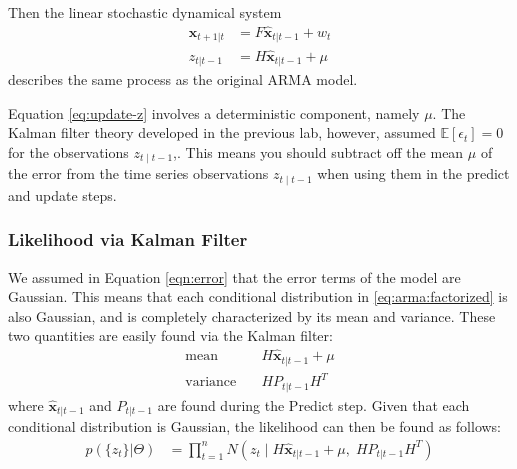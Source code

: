 Then the linear stochastic
dynamical system
\begin{align}
    \hat{\textbf{x}}_{t+1|t} &= F\hat{\textbf{x}}_{t|t-1} + w_t\\
    z_{t|t-1} &= H\hat{\textbf{x}}_{t|t-1} + \mu
    \label{eq:update-z}
\end{align}
describes the same process as the original $\text{ARMA}$ model.

\begin{info}
Equation \ref{eq:update-z} involves a deterministic component, namely $\mu$.
The Kalman filter theory developed in the previous lab, however, assumed $\mathbb{E}[\epsilon_t]=0$ for the observations $z_{t\mid t-1}$,.
This means you should subtract off the mean
$\mu$ of the error from the time series observations $z_{t\mid t-1}$ when using them in the predict and update
steps.
\end{info}

\subsubsection*{Likelihood via Kalman Filter}

We assumed in Equation \ref{eqn:error} that the error terms of the model are Gaussian.
This means that each conditional distribution in \ref{eq:arma:factorized} is also Gaussian, and is completely characterized by its mean and variance.
These two quantities are easily found via the Kalman filter:
\begin{align}
    \text{mean} & \quad H\hat{\textbf{x}}_{t|t-1} + \mu \\
    \text{variance} & \quad HP_{t|t-1}H^T
\end{align}
where $\hat{\textbf{x}}_{t|t-1}$ and $P_{t|t-1}$ are found during the Predict step.
Given that each conditional distribution is Gaussian, the likelihood can then be found as follows:
\begin{align}
    \label{eq:arma:likelihood}
    p(\{z_t\} | \Theta)& = \prod_{t=1}^{n} N(z_t\mid H\hat{\textbf{x}}_{t|t-1} + \mu,\;
    HP_{t|t-1}H^T)
\end{align}

